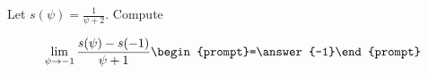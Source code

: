 \documentclass{ximera}
\author{Bart Snapp}
\begin{document}
\begin{exercise}
Let $s(\psi) = \frac{1}{\psi +2}$. Compute

\[
\lim_{ \psi\to -1 } 
\frac{s(\psi)-s(-1)}{\psi +1} \begin{prompt}=\answer{-1}\end{prompt}
\]
\end{exercise}
\end{document}
